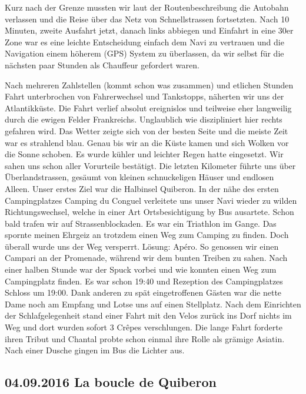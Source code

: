 Kurz nach der Grenze mussten wir laut der Routenbeschreibung die Autobahn verlassen und die Reise über das Netz von Schnellstrassen fortsetzten.
Nach 10 Minuten, zweite Ausfahrt jetzt, danach links abbiegen und Einfahrt in eine 30er Zone war es eine leichte Entscheidung einfach dem Navi zu vertrauen und die Navigation einem höherem (GPS) System zu überlassen, da wir selbst für die nächsten paar Stunden als Chauffeur gefordert waren.


Nach mehreren Zahlstellen (kommt schon was zusammen) und etlichen Stunden Fahrt unterbrochen von Fahrerwechsel und Tankstopps, näherten wir uns der Atlantikküste.
Die Fahrt verlief absolut ereignislos und teilweise eher langweilig durch die ewigen Felder Frankreichs.
Unglaublich wie diszipliniert hier rechts gefahren wird.
Das Wetter zeigte sich von der besten Seite und die meiste Zeit war es strahlend blau.
Genau bis wir an die Küste kamen und sich Wolken vor die Sonne schoben.
Es wurde kühler und leichter Regen hatte eingesetzt.
Wir sahen uns schon aller Vorurteile bestätigt.
Die letzten Kilometer führte uns über Überlandstrassen, gesäumt von kleinen schnuckeligen Häuser und endlosen Alleen.
Unser erstes Ziel war die Halbinsel Quiberon.
In der nähe des ersten Campingplatzes \glqq Camping du Conguel\grqq{} verleitete uns unser Navi wieder zu wilden Richtungswechsel, welche in einer Art Ortsbesichtigung by Bus ausartete.
Schon bald trafen wir auf Strassenblockaden.
Es war ein Triathlon im Gange.
Das spornte meinen Ehrgeiz an trotzdem einen Weg zum Camping zu finden.
Doch überall wurde uns der Weg versperrt.
Lösung: Apéro.
So genossen wir einen Campari an der Promenade, während wir dem bunten Treiben zu sahen.
Nach einer halben Stunde war der Spuck vorbei und wie konnten einen Weg zum Campingplatz finden.
Es war schon 19:40 und Rezeption des Campingplatzes Schloss um 19:00.
Dank anderen zu spät eingetroffenen Gästen war die nette Dame noch am Empfang und Lotse uns auf einen Stellplatz.
Nach dem Einrichten der Schlafgelegenheit stand einer Fahrt mit den Velos zurück ins Dorf nichts im Weg und dort wurden sofort 3 Cr\^{e}pes verschlungen.
Die lange Fahrt forderte ihren Tribut und Chantal probte schon einmal ihre Rolle als grämige Asiatin.
Nach einer Dusche gingen im Bus die Lichter aus.

\subsection{04.09.2016 La boucle de Quiberon}

